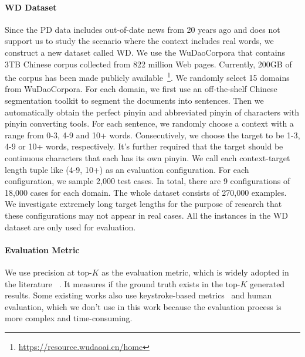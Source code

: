 \paragraph{WD Dataset} Since the PD data includes out-of-date news from 20 years ago and does not support us to study the scenario where the context includes real words, we construct a new dataset called WD.
We use the WuDaoCorpora \cite{YUAN202165} that contains 3TB Chinese corpus collected from 822 million Web pages.
Currently, 200GB of the corpus has been made publicly available~\footnote{\url{https://resource.wudaoai.cn/home}}.
We randomly select 15 domains from WuDaoCorpora.
For each domain, we first use an off-the-shelf Chinese segmentation toolkit \cite{texsmart2020} to segment the documents into sentences.
Then we automatically obtain the perfect pinyin and abbreviated pinyin of characters with pinyin converting tools.
For each sentence, we randomly choose a context with a range from 0-3, 4-9 and 10+ words.
Consecutively, we choose the target to be 1-3, 4-9 or 10+ words, respectively.
It's further required that the target should be continuous characters that each has its own pinyin.
We call each context-target length tuple like (4-9, 10+) as an evaluation configuration.
For each configuration, we sample 2,000 test cases.
In total, there are 9 configurations of 18,000 cases for each domain.  The whole dataset consists of 270,000 examples. 
We investigate extremely long target lengths for the purpose of research that these configurations may not appear in real cases.
All the instances in the WD dataset are only used for evaluation. 


\paragraph{Evaluation Metric} 
We use precision at top-$K$ as the evaluation metric, which is widely adopted in the literature
~\cite{jia-zhao-2014-joint,zhang-etal-arxiv-tracing,zhang-etal-2019-open}. 
It measures if the ground truth exists in the top-$K$ generated results.
Some existing works also use keystroke-based metrics~\cite{jia-zhao-2013-kyss,huang-etal-2015-ijcai-input} and human evaluation, which we don't use in this work because the evaluation process is more complex and time-consuming.

